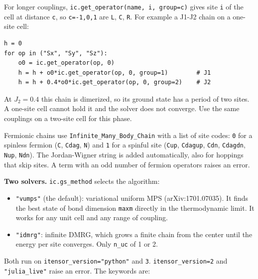 \documentclass[11pt]{article}
\providecommand{\tightlist}{\setlength{\itemsep}{0pt}\setlength{\parskip}{0pt}}
\begin{document}
For longer couplings, \texttt{ic.\allowbreak{}get\_\allowbreak{}operator(name,\ i,\ group=c)} gives site \texttt{i}
of the cell at distance \texttt{c}, so \texttt{c=-1,0,1} are \texttt{L}, \texttt{C}, \texttt{R}. For example
a J1-J2 chain on a one-site cell:

\begin{lstlisting}
h = 0
for op in ("Sx", "Sy", "Sz"):
    o0 = ic.get_operator(op, 0)
    h = h + o0*ic.get_operator(op, 0, group=1)        # J1
    h = h + 0.4*o0*ic.get_operator(op, 0, group=2)    # J2
\end{lstlisting}

At \(J_2=0.4\) this chain is dimerized, so its ground state has a period of
two sites. A one-site cell cannot hold it and the solver does not
converge. Use the same couplings on a two-site cell for this phase.

Fermionic chains use \texttt{Infinite\_\allowbreak{}Many\_\allowbreak{}Body\_\allowbreak{}Chain} with a list of site
codes: \texttt{0} for a spinless fermion (\texttt{C}, \texttt{Cdag}, \texttt{N}) and \texttt{1} for a
spinful site (\texttt{Cup}, \texttt{Cdagup}, \texttt{Cdn}, \texttt{Cdagdn}, \texttt{Nup}, \texttt{Ndn}). The
Jordan-Wigner string is added automatically, also for hoppings that skip
sites. A term with an odd number of fermion operators raises an error.

\textbf{Two solvers.} \texttt{ic.\allowbreak{}gs\_\allowbreak{}method} selects the algorithm:

\begin{itemize}
\tightlist
\item
  \texttt{"vumps"} (the default): variational uniform MPS (arXiv:1701.07035).
  It finds the best state of bond dimension \texttt{maxm} directly in the
  thermodynamic limit. It works for any unit cell and any range of
  coupling.
\item
  \texttt{"idmrg"}: infinite DMRG, which grows a finite chain from the center
  until the energy per site converges. Only \texttt{n\_\allowbreak{}uc} of 1 or 2.
\end{itemize}

Both run on \texttt{itensor\_\allowbreak{}version="python"} and \texttt{3}. \texttt{itensor\_\allowbreak{}version=2} and
\texttt{"julia\_\allowbreak{}live"} raise an error. The keywords are:
\end{document}
